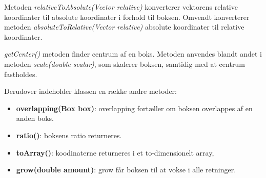 Metoden \emph{relativeToAbsolute(Vector relative)} konverterer vektorens relative koordinater til absolute koordinater i forhold til boksen. Omvendt konverterer metoden \emph{absoluteToRelative(Vector relative)} absolute koordinater til relative koordinater.

\emph{getCenter()} metoden finder centrum af en boks. Metoden anvendes blandt andet i metoden \emph{scale(double scalar)}, som skalerer boksen, samtidig med at centrum fastholdes.

Derudover indeholder klassen en række andre metoder:

\begin{itemize}
	\item \textbf{overlapping(Box box)}: overlapping fortæller om boksen overlappes af en anden boks.
	\item \textbf{ratio()}: boksens ratio returneres.
	\item \textbf{toArray()}: koodinaterne returneres i et to-dimensionelt array,
	\item \textbf{grow(double amount)}: grow får boksen til at vokse i alle retninger.
\end{itemize}